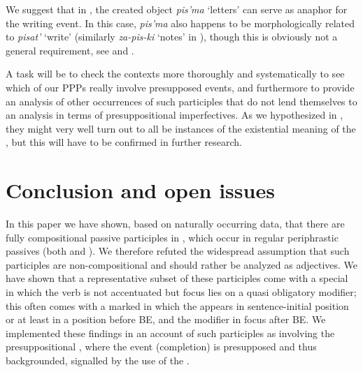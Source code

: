 \documentclass[output=paper,modfonts,newtxmath,hidelinks
\ChapterDOI{10.5281/zenodo.2545513}
]{langscibook}
\begin{document}
\noindent We suggest that in , the created object \textit{pis'ma} `letters' can serve as anaphor for the writing event. In this case, \textit{pis'ma} also happens to be morphologically related to \textit{pisat'} `write' (similarly \textit{za-pis-ki} `notes' in ), though this is obviously not a general requirement, see   and .

A  task will be to check the contexts more thoroughly and systematically to see which of our  PPPs really involve presupposed events, and furthermore to provide an analysis of other occurrences of such participles that do not lend themselves to an analysis in terms of presuppositional imperfectives. As we hypothesized in , they might very well turn out to all be instances of the existential meaning of the , but this will have to be confirmed in further research.

\section{Conclusion and open issues}
\label{concl}

In this paper we have shown, based on naturally occurring data, that there are fully compositional   passive participles in , which occur in regular periphrastic passives (both  and ). We therefore refuted the widespread assumption that such participles are non-compositional and should rather be analyzed as adjectives. We have shown that a representative subset of these participles come with a special  in which the verb is not accentuated but focus lies on a quasi obligatory modifier; this often comes with a marked  in which the  appears in sentence-initial position or at least in a position before BE, and the modifier in focus after BE. We implemented these findings in an account of such participles as involving the presuppositional , where the event (completion) is presupposed and thus backgrounded, signalled by the use of the .
\end{document}
